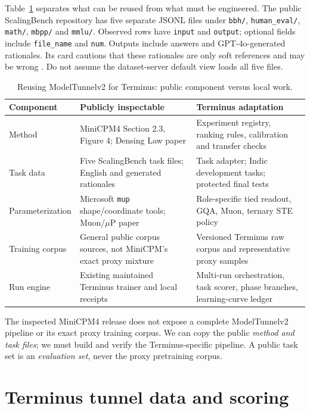 \documentclass[10pt,a4paper]{article}
\begin{document}
Table~\ref{tab:copy} separates what can be reused from what must be engineered. The public ScalingBench repository has five separate JSONL files under \texttt{bbh/}, \texttt{human\_eval/}, \texttt{math/}, \texttt{mbpp/} and \texttt{mmlu/}. Observed rows have \texttt{input} and \texttt{output}; optional fields include \texttt{file\_name} and \texttt{num}. Outputs include answers and GPT-4o-generated rationales. Its card cautions that these rationales are only soft references and may be wrong \cite{scalingbench,densinglaw}. Do not assume the dataset-server default view loads all five files.

\begin{table}[ht]
\centering\small
\caption{Reusing ModelTunnelv2 for Terminus: public component versus local work.}
\label{tab:copy}
\begin{tabularx}{\linewidth}{@{}p{40mm}p{55mm}X@{}}
\toprule
Component & Publicly inspectable & Terminus adaptation \\
\midrule
Method & MiniCPM4 Section 2.3, Figure 4; Densing Law paper & Experiment registry, ranking rules, calibration and transfer checks \\
Task data & Five ScalingBench task files; English and generated rationales & Task adapter; Indic development tasks; protected final tests \\
Parameterization & Microsoft \texttt{mup} shape/coordinate tools; Muon/$\mu$P paper & Role-specific tied readout, GQA, Muon, ternary STE policy \\
Training corpus & General public corpus sources, not MiniCPM's exact proxy mixture & Versioned Terminus raw corpus and representative proxy samples \\
Run engine & Existing maintained Terminus trainer and local receipts & Multi-run orchestration, task scorer, phase branches, learning-curve ledger \\
\bottomrule
\end{tabularx}
\end{table}

The inspected MiniCPM4 release does not expose a complete ModelTunnelv2 pipeline or its exact proxy training corpus. We can copy the public \emph{method and task files}; we must build and verify the Terminus-specific pipeline. A public task set is an \emph{evaluation set}, never the proxy pretraining corpus.

\section{Terminus tunnel data and scoring}
\label{sec:scoring}
\end{document}
